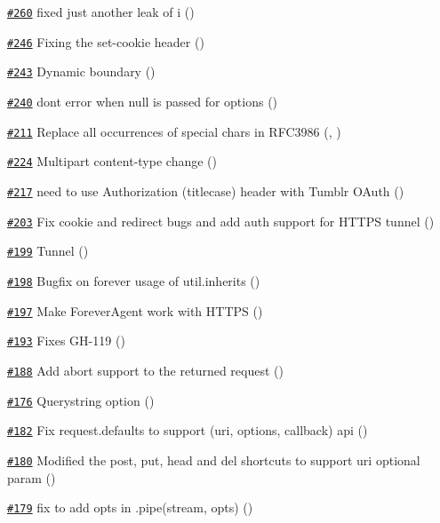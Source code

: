 \begin{DoxyItemize}
\item \href{https://github.com/request/request/pull/260}{\tt \#260} fixed just another leak of \textquotesingle{}i\textquotesingle{} ()
\item \href{https://github.com/request/request/pull/246}{\tt \#246} Fixing the set-\/cookie header ()
\item \href{https://github.com/request/request/pull/243}{\tt \#243} Dynamic boundary ()
\item \href{https://github.com/request/request/pull/240}{\tt \#240} don\textquotesingle{}t error when null is passed for options ()
\item \href{https://github.com/request/request/pull/211}{\tt \#211} Replace all occurrences of special chars in R\+F\+C3986 (, )
\item \href{https://github.com/request/request/pull/224}{\tt \#224} Multipart content-\/type change ()
\item \href{https://github.com/request/request/pull/217}{\tt \#217} need to use Authorization (titlecase) header with Tumblr O\+Auth ()
\item \href{https://github.com/request/request/pull/203}{\tt \#203} Fix cookie and redirect bugs and add auth support for H\+T\+T\+PS tunnel ()
\item \href{https://github.com/request/request/pull/199}{\tt \#199} Tunnel ()
\item \href{https://github.com/request/request/pull/198}{\tt \#198} Bugfix on forever usage of util.\+inherits ()
\item \href{https://github.com/request/request/pull/197}{\tt \#197} Make Forever\+Agent work with H\+T\+T\+PS ()
\item \href{https://github.com/request/request/pull/193}{\tt \#193} Fixes G\+H-\/119 ()
\item \href{https://github.com/request/request/pull/188}{\tt \#188} Add abort support to the returned request ()
\item \href{https://github.com/request/request/pull/176}{\tt \#176} Querystring option ()
\item \href{https://github.com/request/request/pull/182}{\tt \#182} Fix request.\+defaults to support (uri, options, callback) api ()
\item \href{https://github.com/request/request/pull/180}{\tt \#180} Modified the post, put, head and del shortcuts to support uri optional param ()
\item \href{https://github.com/request/request/pull/179}{\tt \#179} fix to add opts in .pipe(stream, opts) ()

\end{DoxyItemize}
